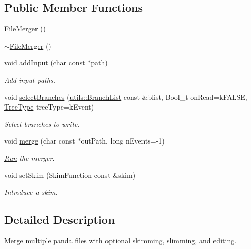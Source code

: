 \subsection*{Public Member Functions}
\begin{DoxyCompactItemize}
\item 
\hyperlink{classpanda_1_1FileMerger_ad3cf13a7f570d6bdf73e5332d72c7e23}{FileMerger} ()
\item 
\hyperlink{classpanda_1_1FileMerger_aadf13463fd306f689eb10abe1ea5cc49}{$\sim$FileMerger} ()
\item 
void \hyperlink{classpanda_1_1FileMerger_a6725e20df5ca4795d030bfb7e274d1c0}{addInput} (char const $\ast$path)
\begin{DoxyCompactList}\small\item\em Add input paths. \item\end{DoxyCompactList}\item 
void \hyperlink{classpanda_1_1FileMerger_aea8571331c878e0176729c8851ac0861}{selectBranches} (\hyperlink{classpanda_1_1utils_1_1BranchList}{utils::BranchList} const \&blist, Bool\_\-t onRead=kFALSE, \hyperlink{classpanda_1_1FileMerger_ae2c288ef71fbf209d48b144eb8b1eecf}{TreeType} treeType=kEvent)
\begin{DoxyCompactList}\small\item\em Select branches to write. \item\end{DoxyCompactList}\item 
void \hyperlink{classpanda_1_1FileMerger_a13a672d0fef3317ce4335d6a56f4229b}{merge} (char const $\ast$outPath, long nEvents=-\/1)
\begin{DoxyCompactList}\small\item\em \hyperlink{classpanda_1_1Run}{Run} the merger. \item\end{DoxyCompactList}\item 
void \hyperlink{classpanda_1_1FileMerger_aabc6f2a72d1d6fd2496d69b70bc16aef}{setSkim} (\hyperlink{classpanda_1_1FileMerger_a391f31b244a3c8defe8e5fed131e0140}{SkimFunction} const \&skim)
\begin{DoxyCompactList}\small\item\em Introduce a skim. \item\end{DoxyCompactList}\end{DoxyCompactItemize}


\subsection{Detailed Description}
Merge multiple \hyperlink{namespacepanda}{panda} files with optional skimming, slimming, and editing. 

